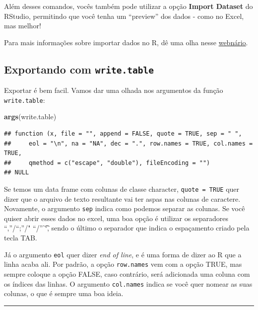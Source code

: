 \documentclass[]{book}
\newenvironment{Shaded}{\begin{snugshade}}{\end{snugshade}}
\newcommand{\KeywordTok}[1]{\textcolor[rgb]{0.13,0.29,0.53}{\textbf{#1}}}
\newcommand{\NormalTok}[1]{#1}
\theoremstyle{definition}
\theoremstyle{definition}
\theoremstyle{definition}
\theoremstyle{remark}
\begin{document}
Além desses comandos, vocês também pode utilizar a opção \textbf{Import
Dataset} do RStudio, permitindo que você tenha um ``preview'' dos dados
- como no Excel, mas melhor!

Para mais informações sobre importar dados no R, dê uma olha nesse
\href{https://www.rstudio.com/resources/webinars/importing-data-into-r/}{webnário}.

\subsection{\texorpdfstring{Exportando com
\texttt{write.table}}{Exportando com write.table}}\label{exportando-com-write.table}

Exportar é bem facil. Vamos dar uma olhada nos argumentos da função
\texttt{write.table}:

\begin{Shaded}
\begin{Highlighting}[]
\KeywordTok{args}\NormalTok{(write.table)}
\end{Highlighting}
\end{Shaded}

\begin{verbatim}
## function (x, file = "", append = FALSE, quote = TRUE, sep = " ", 
##     eol = "\n", na = "NA", dec = ".", row.names = TRUE, col.names = TRUE, 
##     qmethod = c("escape", "double"), fileEncoding = "") 
## NULL
\end{verbatim}

Se temos um data frame com colunas de classe character,
\texttt{quote\ =\ TRUE} quer dizer que o arquivo de texto resultante vai
ter aspas nas colunas de caractere. Novamente, o argumento \texttt{sep}
indica como podemos separar as colunas. Se você quiser abrir esses dados
no excel, uma boa opção é utilizar os separadores ``,''/``;''/"
``/''\t``, sendo o último o separador que indica o espaçamento criado
pela tecla TAB.

Já o argumento \texttt{eol} quer dizer \emph{end of line}, e é uma forma
de dizer ao R que a linha acaba ali. Por padrão, a opção
\texttt{row.names} vem com a opção TRUE, mas sempre coloque a opção
FALSE, caso contrário, será adicionada uma coluna com os índices das
linhas. O argumento \texttt{col.names} indica se você quer nomear as
suas colunas, o que é sempre uma boa ideia.

\begin{center}\rule{0.5\linewidth}{\linethickness}\end{center}
\end{document}
